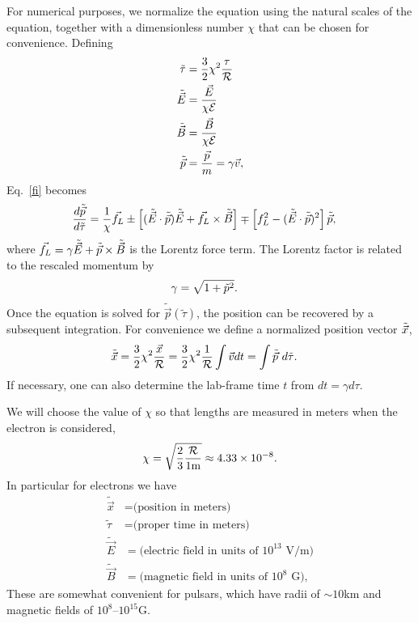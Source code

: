 \documentclass[amsmath,amssymb,nofootinbib,notitlepage,superscriptaddress,twocolumn]{revtex4-2}
\begin{document}
For numerical purposes, we normalize the equation using the natural scales of the equation, together with a dimensionless number $\chi$ that can be chosen for convenience.  Defining
\begin{align}
    \Tilde{\tau}&=\frac{3}{2}\chi^2\frac{\tau}{\mathcal{R}}\\
    \Tilde{\Vec{E}}&=\frac{\Vec{E}}{\chi\mathcal{E}}\\
    \Tilde{\Vec{B}}&=\frac{\Vec{B}}{\chi\mathcal{E}}\\
    \Tilde{\Vec{p}}&=\frac{\Vec{p}}{m}=\gamma\Vec{v},
\end{align}
Eq.~\eqref{fi} becomes
\begin{align}\label{normeq}
    \frac{d\Tilde{\Vec{p}}}{d\Tilde{\tau}}&=\frac{1}{\chi}\Vec{f_L}\pm\left[(\Tilde{\Vec{E}}\cdot \Tilde{\Vec{p}})\Tilde{\Vec{E}}+\Vec{f_L}\times\Tilde{\Vec{B}}\right]\mp\left[f_L^2-(\Tilde{\Vec{E}}\cdot\Tilde{\Vec{p}})^2\right]\Tilde{\Vec{p}},
\end{align}
where
$\Vec{f_L}=\gamma\Tilde{\Vec{E}}+\Tilde{\Vec{p}}\times\Tilde{\Vec{B}}$ is the Lorentz force term.  The Lorentz factor is related to the rescaled momentum by
\begin{align}
    \gamma&=\sqrt{1+\Tilde{p}^2}.
\end{align}
Once the equation is solved for $\tilde{\vec{p}}(\tilde{\tau})$, the position can be recovered by a subsequent integration.  For convenience we define a normalized position vector $\Tilde{\Vec{x}}$,
\begin{align}
    \Tilde{\Vec{x}}&=\frac{3}{2}\chi^2\frac{\Vec{x}}{\mathcal{R}}=\frac{3}{2}\chi^2\frac{1}{\mathcal{R}}\int \Vec{v} dt=\int \Tilde{\Vec{p}}\ d\Tilde{\tau}.
\end{align}
If necessary, one can also determine the lab-frame time $t$ from $dt = \gamma d\tau$.

We will choose the value of $\chi$ so that lengths are measured in meters when the electron is considered,
\begin{align}
    \chi=\sqrt{\frac{2}{3}\frac{\mathcal{R}}{1 {\rm m}}}\approx 4.33\times 10^{-8}.
\end{align}
In particular for electrons we have
\begin{align}
    \tilde{\vec{x}} & = \textrm{(position in meters)} \label{xphys}\\
    \tilde{\tau} & = \textrm{(proper time in meters)} \label{tauphys}\\
    \tilde{\vec{E}} & = \textrm{(electric field in units of $10^{13}$ V/m)} \label{Ephys} \\
    \tilde{\vec{B}} & = \textrm{(magnetic field in units of $10^8$ G)}, \label{Bphys}
\end{align}
These are somewhat convenient for pulsars, which have radii of $\sim10$km and magnetic fields of $10^8$--$10^{15}$G.
\end{document}
